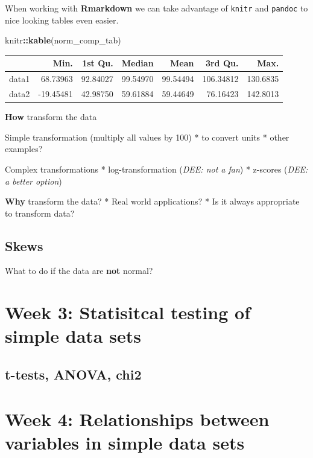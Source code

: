 \documentclass[
]{book}
\newenvironment{Shaded}{\begin{snugshade}}{\end{snugshade}}
\newcommand{\KeywordTok}[1]{\textcolor[rgb]{0.13,0.29,0.53}{\textbf{#1}}}
\newcommand{\NormalTok}[1]{#1}
\newcommand{\OperatorTok}[1]{\textcolor[rgb]{0.81,0.36,0.00}{\textbf{#1}}}
\begin{document}
When working with \textbf{Rmarkdown} we can take advantage of \texttt{knitr} and \texttt{pandoc} to nice looking tables even easier.

\begin{Shaded}
\begin{Highlighting}[]
\NormalTok{knitr}\OperatorTok{::}\KeywordTok{kable}\NormalTok{(norm_comp_tab)}
\end{Highlighting}
\end{Shaded}

\begin{tabular}{l|r|r|r|r|r|r}
\hline
  & Min. & 1st Qu. & Median & Mean & 3rd Qu. & Max.\\
\hline
data1 & 68.73963 & 92.84027 & 99.54970 & 99.54494 & 106.34812 & 130.6835\\
\hline
data2 & -19.45481 & 42.98750 & 59.61884 & 59.44649 & 76.16423 & 142.8013\\
\hline
\end{tabular}

\textbf{How} transform the data

Simple transformation (multiply all values by 100)
* to convert units
* other examples?

Complex transformations
* log-transformation (\emph{DEE: not a fan})
* z-scores (\emph{DEE: a better option})

\textbf{Why} transform the data?
* Real world applications?
* Is it always appropriate to transform data?

\hypertarget{skews}{%
\subsection{Skews}\label{skews}}

What to do if the data are \textbf{not} normal?

\hypertarget{week-3-statisitcal-testing-of-simple-data-sets-1}{%
\section{Week 3: Statisitcal testing of simple data sets}\label{week-3-statisitcal-testing-of-simple-data-sets-1}}

\hypertarget{t-tests-anova-chi2}{%
\subsection{t-tests, ANOVA, chi2}\label{t-tests-anova-chi2}}

\hypertarget{week-4-relationships-between-variables-in-simple-data-sets}{%
\section{Week 4: Relationships between variables in simple data sets}\label{week-4-relationships-between-variables-in-simple-data-sets}}
\end{document}
